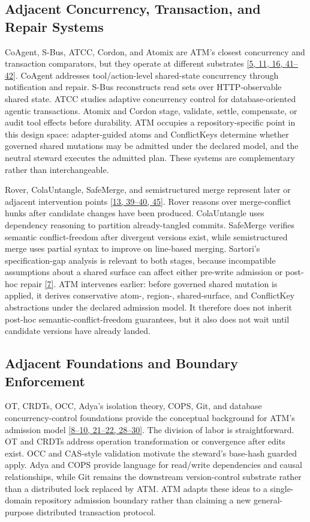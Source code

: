 \documentclass[9pt,letterpaper]{extarticle}
\begin{document}
\subsection{Adjacent Concurrency, Transaction, and Repair Systems}

CoAgent, S-Bus, ATCC, Cordon, and Atomix are ATM's closest concurrency and transaction comparators, but they operate at different substrates \textcolor{atmLinkBlue}{\hyperlink{Item.41}{[5, 11, 16, 41--42]}}. CoAgent addresses tool/action-level shared-state concurrency through notification and repair. S-Bus reconstructs read sets over HTTP-observable shared state. ATCC studies adaptive concurrency control for database-oriented agentic transactions. Atomix and Cordon stage, validate, settle, compensate, or audit tool effects before durability. ATM occupies a repository-specific point in this design space: adapter-guided atoms and ConflictKeys determine whether governed shared mutations may be admitted under the declared model, and the neutral steward executes the admitted plan. These systems are complementary rather than interchangeable.

Rover, ColaUntangle, SafeMerge, and semistructured merge represent later or adjacent intervention points \textcolor{atmLinkBlue}{\hyperlink{Item.49}{[13, 39--40, 45]}}. Rover reasons over merge-conflict hunks after candidate changes have been produced. ColaUntangle uses dependency reasoning to partition already-tangled commits. SafeMerge verifies semantic conflict-freedom after divergent versions exist, while semistructured merge uses partial syntax to improve on line-based merging. Sartori's specification-gap analysis is relevant to both stages, because incompatible assumptions about a shared surface can affect either pre-write admission or post-hoc repair \textcolor{atmLinkBlue}{\hyperlink{Item.43}{[7]}}. ATM intervenes earlier: before governed shared mutation is applied, it derives conservative atom-, region-, shared-surface, and ConflictKey abstractions under the declared admission model. It therefore does not inherit post-hoc semantic-conflict-freedom guarantees, but it also does not wait until candidate versions have already landed.

\subsection{Adjacent Foundations and Boundary Enforcement}

OT, CRDTs, OCC, Adya's isolation theory, COPS, Git, and database concurrency-control foundations provide the conceptual background for ATM's admission model \textcolor{atmLinkBlue}{\hyperlink{Item.44}{[8--10, 21--22, 28--30]}}. The division of labor is straightforward. OT and CRDTs address operation transformation or convergence after edits exist. OCC and CAS-style validation motivate the steward's base-hash guarded apply. Adya and COPS provide language for read/write dependencies and causal relationships, while Git remains the downstream version-control substrate rather than a distributed lock replaced by ATM. ATM adapts these ideas to a single-domain repository admission boundary rather than claiming a new general-purpose distributed transaction protocol.
\end{document}
